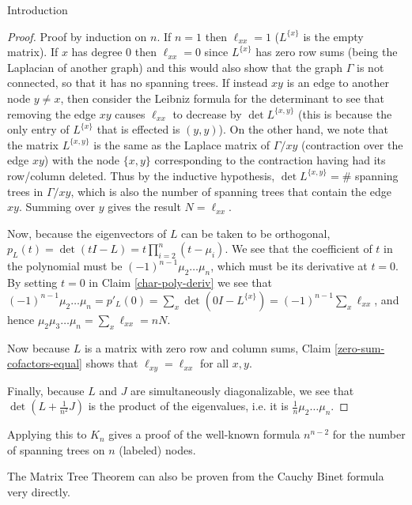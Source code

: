 \documentclass{article}
\begin{document}
\begin{section}{Introduction}
\begin{proof}
    Proof by induction on $n$.
    If $n = 1$ then $\ell_{xx} = 1$ ($L^{\{x\}}$ is the empty matrix).
    If $x$ has degree 0 then $\ell_{xx} = 0$ since $L^{\{x\}}$ has zero row sums (being the Laplacian of another graph) and this would also show that the graph $\Gamma$ is not connected, so that it has no spanning trees.
    If instead $xy$ is an edge to another node $y \neq x$, then consider the Leibniz formula for the determinant to see that removing the edge $xy$ causes $\ell_{xx}$ to decrease by $\det L^{\{x,y\}}$ (this is because the only entry of $L^{\{x\}}$ that is effected is $(y,y)$).
    On the other hand, we note that the matrix $L^{\{x,y\}}$ is the same as the Laplace matrix of $\Gamma/xy$ (contraction over the edge $xy$) with the node $\{x,y\}$ corresponding to the contraction having had its row/column deleted.
    Thus by the inductive hypothesis, $\det L^{\{x,y\}} = \#$ spanning trees in $\Gamma/xy$, which is also the number of spanning trees that contain the edge $xy$.
    Summing over $y$ gives the result $N = \ell_{xx}$.

    Now, because the eigenvectors of $L$ can be taken to be orthogonal, $p_L(t) = \det(tI - L) = t\prod_{i = 2}^n(t-\mu_i)$.
    We see that the coefficient of $t$ in the polynomial must be $(-1)^{n-1}\mu_2\hdots\mu_n$, which must be its derivative at $t = 0$.
    By setting $t = 0$ in Claim \ref{char-poly-deriv} we see that $(-1)^{n-1}\mu_2\hdots\mu_n = p'_L(0) = \sum_x\det(0I-L^{\{x\}}) = (-1)^{n-1}\sum_x\ell_{xx}$,
    and hence $\mu_2\mu_3\hdots\mu_n = \sum_x\ell_{xx} = nN$.

    Now because $L$ is a matrix with zero row and column sums, Claim \ref{zero-sum-cofactors-equal} shows that $\ell_{xy} = \ell_{xx}$ for all $x,y$.

    Finally, because $L$ and $J$ are simultaneously diagonalizable, we see that $\det(L + \frac{1}{n^2}J)$ is the product of the eigenvalues, i.e. it is $\frac{1}{n}\mu_2\hdots\mu_n$.

  \end{proof}

  Applying this to $K_n$ gives a proof of the well-known formula $n^{n-2}$ for the number of spanning trees on $n$ (labeled) nodes.

  The Matrix Tree Theorem can also be proven from the Cauchy Binet formula very directly.


\end{section}
\end{document}
